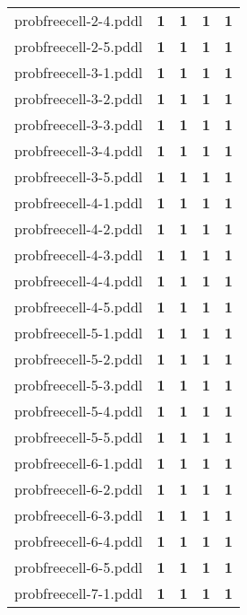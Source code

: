 \documentclass{article}
\begin{document}
\begin{tabular}{@{}lrrrr@{}}
probfreecell-2-4.pddl & \textbf{1} & \textbf{1} & \textbf{1} & \textbf{1} \\
probfreecell-2-5.pddl & \textbf{1} & \textbf{1} & \textbf{1} & \textbf{1} \\
probfreecell-3-1.pddl & \textbf{1} & \textbf{1} & \textbf{1} & \textbf{1} \\
probfreecell-3-2.pddl & \textbf{1} & \textbf{1} & \textbf{1} & \textbf{1} \\
probfreecell-3-3.pddl & \textbf{1} & \textbf{1} & \textbf{1} & \textbf{1} \\
probfreecell-3-4.pddl & \textbf{1} & \textbf{1} & \textbf{1} & \textbf{1} \\
probfreecell-3-5.pddl & \textbf{1} & \textbf{1} & \textbf{1} & \textbf{1} \\
probfreecell-4-1.pddl & \textbf{1} & \textbf{1} & \textbf{1} & \textbf{1} \\
probfreecell-4-2.pddl & \textbf{1} & \textbf{1} & \textbf{1} & \textbf{1} \\
probfreecell-4-3.pddl & \textbf{1} & \textbf{1} & \textbf{1} & \textbf{1} \\
probfreecell-4-4.pddl & \textbf{1} & \textbf{1} & \textbf{1} & \textbf{1} \\
probfreecell-4-5.pddl & \textbf{1} & \textbf{1} & \textbf{1} & \textbf{1} \\
probfreecell-5-1.pddl & \textbf{1} & \textbf{1} & \textbf{1} & \textbf{1} \\
probfreecell-5-2.pddl & \textbf{1} & \textbf{1} & \textbf{1} & \textbf{1} \\
probfreecell-5-3.pddl & \textbf{1} & \textbf{1} & \textbf{1} & \textbf{1} \\
probfreecell-5-4.pddl & \textbf{1} & \textbf{1} & \textbf{1} & \textbf{1} \\
probfreecell-5-5.pddl & \textbf{1} & \textbf{1} & \textbf{1} & \textbf{1} \\
probfreecell-6-1.pddl & \textbf{1} & \textbf{1} & \textbf{1} & \textbf{1} \\
probfreecell-6-2.pddl & \textbf{1} & \textbf{1} & \textbf{1} & \textbf{1} \\
probfreecell-6-3.pddl & \textbf{1} & \textbf{1} & \textbf{1} & \textbf{1} \\
probfreecell-6-4.pddl & \textbf{1} & \textbf{1} & \textbf{1} & \textbf{1} \\
probfreecell-6-5.pddl & \textbf{1} & \textbf{1} & \textbf{1} & \textbf{1} \\
probfreecell-7-1.pddl & \textbf{1} & \textbf{1} & \textbf{1} & \textbf{1} \\

\end{tabular}
\end{document}
